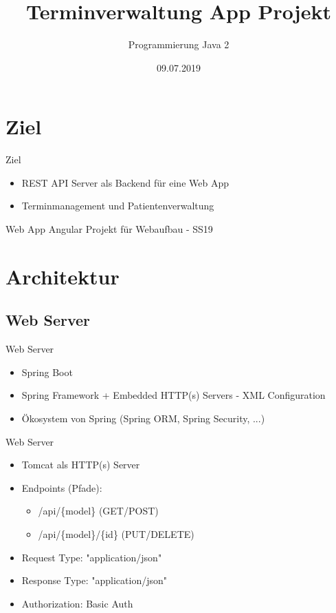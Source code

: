 \documentclass{beamer}
\title{Terminverwaltung App Projekt}
\author{Programmierung Java 2}
\date{09.07.2019}
\begin{document}
\begin{frame}
	\titlepage
\end{frame}

\section{Ziel}

\begin{frame}{Ziel}
	
	\begin{itemize}
		\item REST API Server als Backend für eine Web App
		\item Terminmanagement und Patientenverwaltung 
	\end{itemize}
	
	\vskip 1cm
	
	\begin{block}{Web App}
		Angular Projekt für Webaufbau - SS19
	\end{block}
	
\end{frame}

\section{Architektur}

\subsection{Web Server}

\begin{frame}{Web Server}
	
	\begin{itemize}
		\item Spring Boot
		\item Spring Framework + Embedded HTTP(s) Servers - XML Configuration
		\item Ökosystem von Spring (Spring ORM, Spring Security, ...)
	\end{itemize}
	
\end{frame}


\begin{frame}{Web Server}
	
	\begin{itemize}
		\item Tomcat als HTTP(s) Server
		\item Endpoints (Pfade):
		      \begin{itemize}
		      	\item /api/\{model\} \hspace{10mm} (GET/POST)
		      	\item /api/\{model\}/\{id\} \hspace{2mm} (PUT/DELETE)
		      \end{itemize}
		\item Request Type: "application/json"
		\item Response Type: "application/json"
		\item Authorization: Basic Auth
	\end{itemize}
	
\end{frame}
\end{document}
